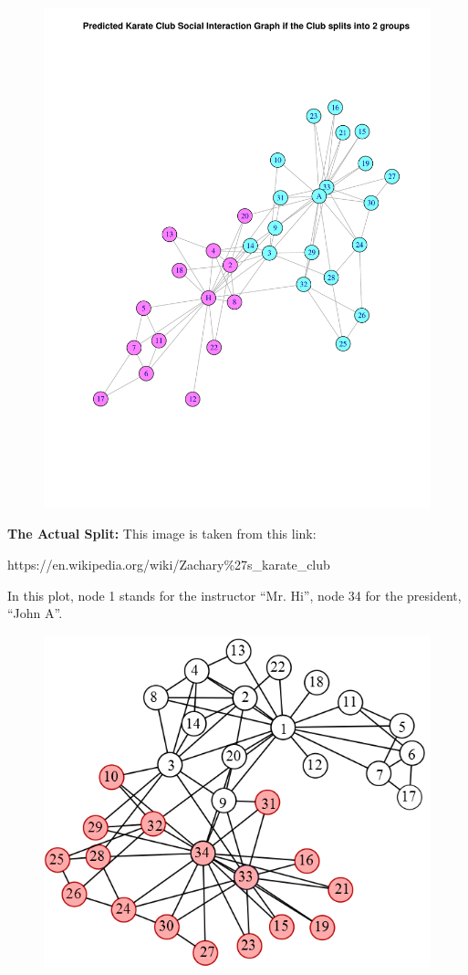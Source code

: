 \documentclass[a4paper, 11pt]{article}
\begin{document}
\begin{figure}[H]
\centering
\includegraphics[scale=0.7]{2.pdf}
\end{figure}

\pagebreak

\textbf{The Actual Split:}
This image is taken from this link:

https://en.wikipedia.org/wiki/Zachary\%27s\_karate\_club

In this plot, node 1 stands for the instructor ``Mr. Hi'', node 34 for the president, ``John A''.

\begin{figure}[H]
\centering
\includegraphics[scale=0.7]{after.png}
\end{figure}
\end{document}
